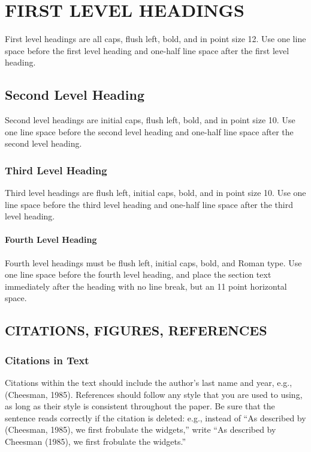 \documentclass[twoside]{article}
\begin{document}
\section{FIRST LEVEL HEADINGS}

First level headings are all caps, flush left, bold, and in point size
12. Use one line space before the first level heading and one-half line space
after the first level heading.

\subsection{Second Level Heading}

Second level headings are initial caps, flush left, bold, and in point
size 10. Use one line space before the second level heading and one-half line
space after the second level heading.

\subsubsection{Third Level Heading}

Third level headings are flush left, initial caps, bold, and in point
size 10. Use one line space before the third level heading and one-half line
space after the third level heading.

\paragraph{Fourth Level Heading}

Fourth level headings must be flush left, initial caps, bold, and
Roman type.  Use one line space before the fourth level heading, and
place the section text immediately after the heading with no line
break, but an 11 point horizontal space.

\subsection{CITATIONS, FIGURES, REFERENCES}


\subsubsection{Citations in Text}

Citations within the text should include the author's last name and
year, e.g., (Cheesman, 1985). References should follow any style that
you are used to using, as long as their style is consistent throughout
the paper.  Be sure that the sentence reads correctly if the citation
is deleted: e.g., instead of ``As described by (Cheesman, 1985), we
first frobulate the widgets,'' write ``As described by Cheesman
(1985), we first frobulate the widgets.''  %
\end{document}
